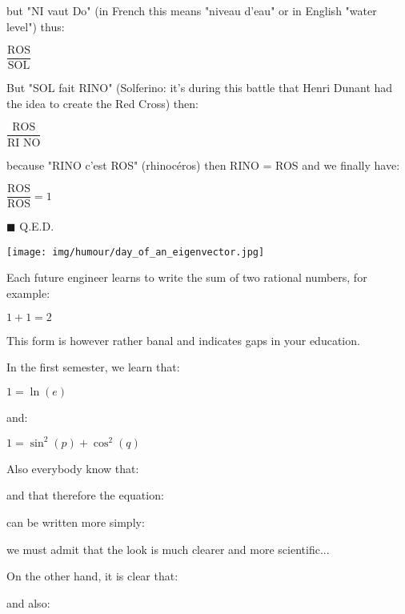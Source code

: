 	but "NI vaut Do" (in French this means "niveau d'eau" or in English "water level") thus:
	\begin{center}
	$\dfrac{\text{ROS}}{\text{SOL}}$  
	\end{center}
	
	But "SOL fait RINO" (Solferino: it's during this battle that Henri Dunant had the idea to create the Red Cross) then: 
	\begin{center}
	$\dfrac{\text{ROS}}{\text{RI NO}}$  
	\end{center}
	
	because "RINO c'est ROS" (rhinocéros) then RINO = ROS and we finally have: 
	\begin{center}
	$\dfrac{\text{ROS}}{\text{ROS}}=1$  
	\end{center}

	\begin{flushright}
		$\blacksquare$  Q.E.D.
	\end{flushright}	

	\begin{center}\underline{\hspace{5 cm}}\end{center}
	\begin{center}
		\texttt{[image: img/humour/day\_of\_an\_eigenvector.jpg]}	
	\end{center}
	Each future engineer learns to write the sum of two rational numbers, for example:
	\begin{center}
	$1+1=2$  
	\end{center}
	
	This form is however rather banal and indicates gaps in your education.
	
	In the first semester, we learn that:
	\begin{center}
	$1=\ln(e)$  
	\end{center}
	
	and:
	\begin{center}
	$1=\sin^2(p)+\cos^2(q)$  
	\end{center}
	
	Also everybody know that:
	
	
	and that therefore the equation:
	
	
	can be written more simply:
	
	
	we must admit that the look is much clearer and more scientific...
	
	On the other hand, it is clear that:
	
	
	and also:
	
